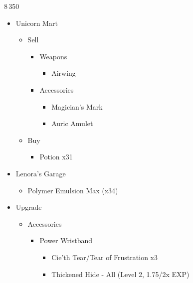\begin{multicols}{2}
	\begin{shop}{8\,350}
		\begin{itemize}
			\item Unicorn Mart
			      \begin{itemize}
				      \item Sell
				            \begin{itemize}
					            \item Weapons
					                  \begin{itemize}
						                  \item Airwing
					                  \end{itemize}
					            \item Accessories
					                  \begin{itemize}
						                  \item Magician's Mark
						                  \item Auric Amulet
					                  \end{itemize}
				            \end{itemize}
				      \item Buy
				            \begin{itemize}
					            \item Potion x31
				            \end{itemize}
			      \end{itemize}
			\item Lenora's Garage
			      \begin{itemize}
				      \item Polymer Emulsion Max (x34)
			      \end{itemize}
		\end{itemize}
	\end{shop}
	\begin{upgrade}
		\begin{itemize}
			\item Upgrade
			      \begin{itemize}
				      \item Accessories
				            \begin{itemize}
					            \item Power Wristband
					                  \begin{itemize}
						                  \item Cie'th Tear/Tear of Frustration x3
						                  \item Thickened Hide - All (Level 2, 1.75/2x EXP)

\end{itemize}
\end{itemize}
\end{itemize}
\end{itemize}
\end{upgrade}
\end{multicols}
